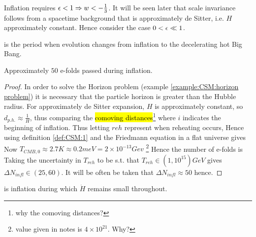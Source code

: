 \documentclass{article}
\begin{document}
Inflation requires $\epsilon < 1 \Rightarrow w < -\frac{1}{3}$. It will be seen later that scale invariance follows from a spacetime background that is approximately de Sitter, i.e. $H$ approximately constant. Hence consider the case $0< \epsilon \ll 1$. 

\begin{definition}[Reheating]
 is the period when evolution changes from inflation to the decelerating hot Big Bang. 
\end{definition}

\begin{prop}
Approximately $50$ e-folds passed during inflation. 
\end{prop}
\begin{proof}
In order to solve the Horizon problem (example \ref{example:CSM:horizon problem}) it is necessary that the particle horizon is greater than the Hubble radius. For approximately de Sitter expansion, $H$ is approximately constant, so $d_{p.h.}\approx \frac{1}{H}$, thus comparing the \hl{comoving distances}\footnote{why the comoving distances?} 
where $i$ indicates the beginning of inflation. Thus letting $reh$ represent when reheating occurs, 
Hence using definition \ref{def:CSM:1} and the Friedmann equation in a flat universe 
gives 
Now $T_{CMB,0} \approx 2.7K \approx 0.2 meV = 2 \times 10^{-13} Gev $
\footnote{value given in notes is $4\times 10^{21}$. Why?}
Hence the number of e-folds is 
Taking the uncertainty in $T_{reh}$ to be s.t. that $T_{reh} \in (1,10^{15}) GeV$ gives $\Delta N_{infl} \in (25,60)$. It will be often be taken that $\Delta N_{infl} \approx 50$ hence. 
\end{proof}

\begin{definition}
 is inflation during which $\dot{H}$ remains small throughout.
\end{definition}
\end{document}
